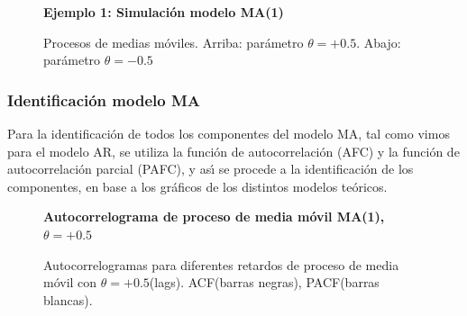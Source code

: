\begin{figure}[H]
	\centering
	\textbf{Ejemplo 1: Simulaci\'on modelo MA(1)}\par\medskip
	\caption{Procesos de medias móviles. Arriba: parámetro $\theta=+0.5$. Abajo: parámetro $\theta=-0.5$}\label{fig9}
\end{figure}


\pagebreak
\subsubsection{Identificaci\'on modelo MA }
Para la identificaci\'on de todos los componentes del modelo MA, tal como vimos para el modelo AR, se utiliza la funci\'on de autocorrelaci\'on (AFC) y la funci\'on de autocorrelaci\'on parcial (PAFC), y as\'{\i} se procede a la identificaci\'on de los componentes, en base a los gr\'aficos de los distintos modelos te\'oricos.

\begin{figure}[H]
	\centering
	\textbf{Autocorrelograma de proceso de media móvil MA(1), $\theta=+0.5$}\par\medskip
	\caption{Autocorrelogramas para diferentes retardos de proceso de media móvil con $\theta=+0.5$(lags). ACF(barras negras), PACF(barras blancas).}\label{fig10}
\end{figure}


